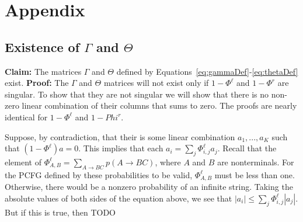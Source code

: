 \documentclass{article}
\begin{document}
\section{Appendix}
\subsection{Existence of $\Gamma$ and $\Theta$}
\textbf{Claim: } The matrices $\Gamma$ and $\Theta$ defined by
Equations~\ref{eq:gammaDef}-\ref{eq:thetaDef} exist.  \textbf{Proof: }
The $\Gamma$ and $\Theta$ matrices will not exist only if
$1-\Phi^\ell$ and $1-\Phi^r$ are singular. To show that they are not
singular we will show that there is no non-zero linear combination of
their columns that sums to zero. The proofs are nearly identical for
$1-\Phi^\ell$ and $1-Phi^r$. 

Suppose, by contradiction, that their is some linear combination $a_1,
..., a_K$ such that $(1-\Phi^\ell) a = 0$. This implies that each $a_i
= \sum_{j} \Phi^\ell_{i, j} a_j$. Recall that the element of
$\Phi^\ell_{A, B} = \sum_{A \rightarrow B C} p(A \rightarrow B C)$,
where $A$ and $B$ are nonterminals. For the PCFG defined by these
probabilities to be valid, $\Phi^\ell_{A,B}$ must be less than
one. Otherwise, there would be a nonzero probability of an infinite
string. Taking the absolute values of both sides of the equation
above, we see that $|{a_i}| \leq \sum_{j} \Phi^\ell_{i, j} |
a_j|$. But if this is true, then  TODO



\end{document}

